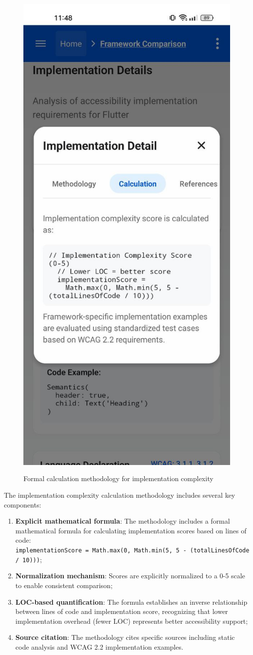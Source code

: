 \begin{figure}[ht]
    \centering
    \includegraphics[width=0.4\linewidth, alt={Implementation complexity calculation methodology}]{img/implementation-calculation.jpg}
    \caption{Formal calculation methodology for implementation complexity}
    \label{fig:implementation_complexity_methodology}
\end{figure}

The implementation complexity calculation methodology includes several key components:

\begin{enumerate}
    \item \textbf{Explicit mathematical formula}: The methodology includes a formal mathematical formula for calculating implementation scores based on lines of code: \\\texttt{implementationScore = Math.max(0, Math.min(5, 5 - (totalLinesOfCode / 10)))};
    
    \item \textbf{Normalization mechanism}: Scores are explicitly normalized to a 0-5 scale to enable consistent comparison;
    
    \item \textbf{LOC-based quantification}: The formula establishes an inverse relationship between lines of code and implementation score, recognizing that lower implementation overhead (fewer LOC) represents better accessibility support;
    
    \item \textbf{Source citation}: The methodology cites specific sources including static code analysis and WCAG 2.2 implementation examples.
\end{enumerate}

